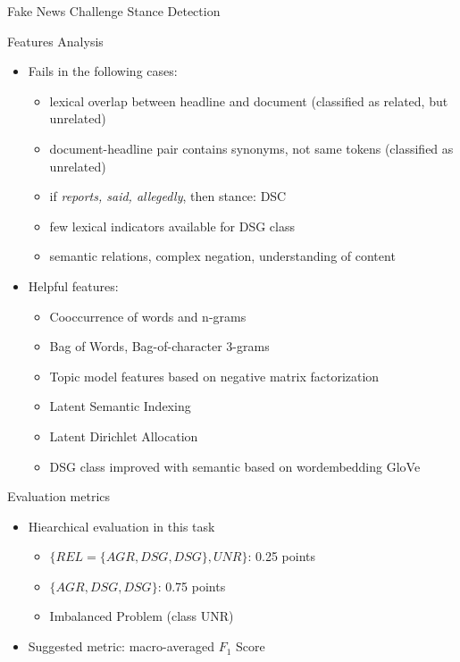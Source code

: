 \documentclass[english,handout]{mlutalk}
\begin{document}
\begin{frame}[allowframebreaks]{Fake News Challenge Stance Detection~\cite{HanselowskiSSCC2018}}
    \framebreak
    \begin{block}{Features Analysis}
      \begin{itemize}
          \item Fails in the following cases:
            \begin{itemize}
                \item lexical overlap between headline and document (classified as related, but unrelated)
                \item document-headline pair contains synonyms, not same tokens (classified as unrelated)
                \item if \textit{reports, said, allegedly}, then stance: DSC
                \item few lexical indicators available for DSG class
                \item semantic relations, complex negation, understanding of content
            \end{itemize}
          \item Helpful features:
          \begin{itemize}
              \item Cooccurrence of words and n-grams
              \item Bag of Words, Bag-of-character 3-grams
              \item Topic model features based on negative matrix factorization
              \item Latent Semantic Indexing
              \item Latent Dirichlet Allocation
              \item DSG class improved with semantic based on wordembedding GloVe
          \end{itemize}
      \end{itemize}
    \end{block}
    
    \framebreak
  
    \begin{block}{Evaluation metrics}
      \begin{itemize}
          \item Hiearchical evaluation in this task
            \begin{itemize}
                \item $\{ REL=\{AGR, DSG, DSG\}, UNR\}$: 0.25 points
                \item $\{AGR, DSG, DSG\}$: 0.75 points
                \item Imbalanced Problem (class UNR)
            \end{itemize}
          \item Suggested metric: macro-averaged $F_1$ Score 
      \end{itemize}
    \end{block}
\end{frame}
\end{document}
